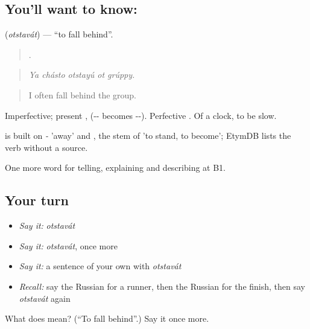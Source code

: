 \subsection*{You'll want to know: }
\textbf{} (\emph{otstavát}) — \textquotedblleft{}to fall behind\textquotedblright{}.

\begin{quote}
    .
\end{quote}

\begin{quote}
\emph{Ya chásto otstayú ot grúppy.}
\end{quote}

\begin{quote}
I often fall behind the group.
\end{quote}

Imperfective; present ,  (-- becomes --). Perfective . Of a clock, to be slow.

\begin{cousinweb}
\emph{} is built on \emph{-} 'away' and \emph{}, the stem of \emph{} 'to stand, to become'; EtymDB lists the verb without a source.
\end{cousinweb}

\begin{grammarlens}[title={What you've built}]
One more word for telling, explaining and describing at B1.
\end{grammarlens}

\subsection*{Your turn}
\begin{itemize}
\raggedright
  \item \emph{Say it:} \emph{otstavát}
  \item \emph{Say it:} \emph{otstavát}, once more
  \item \emph{Say it:} a sentence of your own with \emph{otstavát}
  \item \emph{Recall:} say the Russian for a runner, then the Russian for the finish, then say \emph{otstavát} again
\end{itemize}

\begin{tcolorbox}[breakable,colback=teal!4,colframe=teal!35!black,title={Before you move on}]
What does  mean? (\textquotedblleft{}To fall behind\textquotedblright{}.) Say it once more.
\end{tcolorbox}
